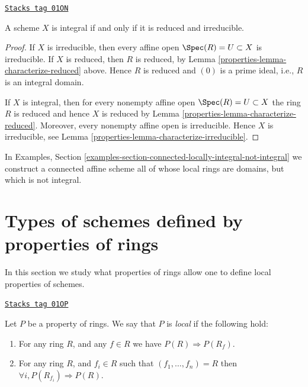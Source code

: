 \begin{lemma}
\label{properties-lemma-characterize-integral}
\href{https://stacks.math.columbia.edu/tag/01ON}{\texttt{Stacks tag 01ON}}

A scheme $X$ is integral if and only if it is reduced and irreducible.
\end{lemma}

\begin{proof}

If $X$ is irreducible, then every affine open $\Spec(R) = U \subset X$
is irreducible. If $X$ is reduced, then $R$ is reduced, by
Lemma \ref{properties-lemma-characterize-reduced} above. Hence $R$ is reduced
and $(0)$ is a prime ideal, i.e., $R$ is an integral domain.

\medskip\noindent
If $X$ is integral, then for every nonempty affine open
$\Spec(R) = U \subset X$ the ring $R$ is reduced
and hence $X$ is reduced by Lemma \ref{properties-lemma-characterize-reduced}.
Moreover, every nonempty affine open is irreducible.
Hence $X$ is irreducible, see Lemma \ref{properties-lemma-characterize-irreducible}.
\end{proof}

In Examples, Section
\ref{examples-section-connected-locally-integral-not-integral}
we construct a connected affine scheme all of whose local rings are domains,
but which is not integral.

\section{Types of schemes defined by properties of rings}
\label{properties-section-properties-rings}
In this section we study what properties of rings
allow one to define local properties of schemes.

\begin{definition}
\label{properties-definition-property-local}
\href{https://stacks.math.columbia.edu/tag/01OP}{\texttt{Stacks tag 01OP}}

Let $P$ be a property of rings.
We say that $P$ is {\it local} if the following hold:
\begin{enumerate}
\item For any ring $R$, and any $f \in R$ we have
$P(R) \Rightarrow P(R_f)$.
\item For any ring $R$, and $f_i \in R$ such that
$(f_1, \ldots, f_n) = R$ then
$\forall i, P(R_{f_i}) \Rightarrow P(R)$.
\end{enumerate}
\end{definition}

